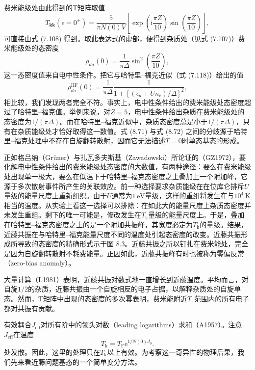 费米能级处由此得到的T矩阵取值
\begin{equation*}
T_{\mathbf{k}\mathbf{k}}(\epsilon=0^{+}) = \frac{5}{\pi N(0)V}\left[\exp\left(\mathrm{i}\frac{\pi Z}{10}\right)\sin\left(\frac{\pi Z}{10}\right)\right],
\tag{8.70}
\end{equation*}
可直接由式 (7.108) 得到。取此表达式的虚部，便得到杂质处（见式 (7.107)）费米能级处的态密度
\begin{equation*}
\rho_{d\sigma}(0) = \frac{1}{\pi\Delta}\sin^2\left(\frac{\pi Z}{10}\right),
\tag{8.71}
\end{equation*}
这一态密度值来自电中性条件。把它与哈特里–福克近似（式 (7.118)）给出的值
\begin{equation*}
\rho_{d\sigma}^{\mathrm{HF}}(0) = \frac{1}{\pi\Delta}\frac{1}{1+[(\epsilon_d+Un_{\mathrm{c}})/\Delta]^2},
\tag{8.72}
\end{equation*}
相比较，我们发现两者完全不符。事实上，电中性条件给出的费米能级处态密度超过了哈特里–福克值。举例来说，对$Z=5$，电中性条件给出杂质在费米能级处的态密度为$1/(\pi\Delta)$。而在哈特里–福克近似中，杂质态密度总是小于$1/(\pi\Delta)$，只有在杂质能级处才恰好取得这一数值。式 (8.71) 与式 (8.72) 之间的分歧源于哈特里–福克处理中不存在自旋翻转散射，因而它无法描述$T=0$时单态基态的形成。

正如格吕纳（Grüner）与扎瓦多夫斯基（Zawadowski）所论证的（GZ1972），要化解电中性条件给出的费米能级处态密度的大数值，有两种途径：要么在费米能级处出现单一极大，要么在低温下于哈特里–福克态密度之上叠加上一个附加峰，它源于多次散射事件所产生的关联效应。前一种选择要求杂质能级在在位库仑排斥$U$量级的能量尺度上重新组织。由于$U$通常为$1\,\mathrm{eV}$量级，这样的重组将发生在与$10^4\,\mathrm{K}$相当的温度。从实验上看这一选择可以排除：在如此大的能量尺度上杂质态密度并未发生重组。剩下的唯一可能是，修改发生在$T_{\mathrm{k}}$量级的能量尺度上。于是，叠加在哈特里–福克态密度之上的是一个附加共振峰，其宽度必定为$T_{\mathrm{k}}$的量级。结果，近藤共振在与哈特里–福克能量尺度不同的温度处引起态密度的改变。近藤共振形成所导致的态密度的精确形式示于图 8.3。近藤共振之所以钉扎在费米能处，完全是因为自旋翻转散射不耗费能量。正因如此，近藤共振峰有时也被称为零偏反常（zero-bias anomaly）。

大量计算（L1981）表明，近藤共振对数式地一直增长到近藤温度。平均而言，对自旋$1/2$的杂质，近藤共振由一个自旋相反的电子占据，以解释杂质处的自旋单态。然而，T矩阵中出现的态密度的多次幂表明，费米能附近$T_{\mathrm{k}}$范围内的所有电子都对共振有贡献。

有效耦合$J_{\mathrm{eff}}$对所有阶中的领头对数（leading logarithms）求和（A1957）。注意$J_{\mathrm{eff}}$在温度
\begin{equation*}
T_{\mathrm{k}} = T_{\mathrm{F}}\mathrm{e}^{1/N(0)J_0}.
\tag{8.73}
\end{equation*}
处发散。因此，这里的处理只在$T_{\mathrm{k}}$以上有效。为考察这一奇异性的物理后果，我们先来看近藤问题基态的一个简单变分方法。


